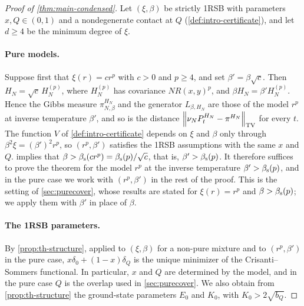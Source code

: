 \begin{proof}[Proof of \cref{thm:main-condensed}]
Let $(\xi,\beta)$ be strictly 1RSB with parameters $x,Q\in(0,1)$ and a nondegenerate contact at $Q$ (\cref{def:intro-certificate}), and let $d\ge4$ be the minimum degree of $\xi$.

\paragraph{Pure models.}
Suppose first that $\xi(r)=cr^p$ with $c>0$ and $p\ge4$, and set $\beta'=\beta\sqrt c$. Then $H_N=\sqrt c\,H_N^{(p)}$, where $H_N^{(p)}$ has covariance $NR(x,y)^p$, and $\beta H_N=\beta'H_N^{(p)}$. Hence the Gibbs measure $\pi^{H_N}_{N,\beta}$ and the generator $L_{\beta,H_N}$ are those of the model $r^p$ at inverse temperature $\beta'$, and so is the distance $\left\lVert\nu_NP^{H_N}_t-\pi^{H_N}\right\rVert_{\mathrm{TV}}$ for every $t$. The function $V$ of \cref{def:intro-certificate} depends on $\xi$ and $\beta$ only through $\beta^2\xi=(\beta')^2r^p$, so $(r^p,\beta')$ satisfies the 1RSB assumptions with the same $x$ and $Q$.  implies that $\beta>\beta_{\mathrm s}(cr^p)=\beta_{\mathrm s}(p)/\sqrt c$, that is, $\beta'>\beta_{\mathrm s}(p)$. It therefore suffices to prove the theorem for the model $r^p$ at the inverse temperature $\beta'>\beta_{\mathrm s}(p)$, and in the pure case we work with $(r^p,\beta')$ in the rest of the proof. This is the setting of \cref{sec:purecover}, whose results are stated for $\xi(r)=r^p$ and $\beta>\beta_{\mathrm s}(p)$; we apply them with $\beta'$ in place of $\beta$.

\paragraph{The 1RSB parameters.}
By \cref{prop:th-structure}, applied to $(\xi,\beta)$ for a non-pure mixture and to $(r^p,\beta')$ in the pure case, $x\delta_0+(1-x)\delta_Q$ is the unique minimizer of the Crisanti--Sommers functional. In particular, $x$ and $Q$ are determined by the model, and in the pure case $Q$ is the overlap used in \cref{sec:purecover}. We also obtain from \cref{prop:th-structure} the ground-state parameters $E_0$ and $K_0$, with $K_0>2\sqrt{b_Q}$.


\end{proof}
